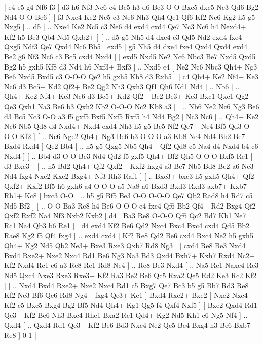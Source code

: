 \makegametitle 
|   e4   e5    g4   Nf6    f3 [  d3 h6  Nf3 Nc6  c4 Bc5  h3 d6  Be3 O-O  Bxc5 dxc5  Nc3 Qd6  Bg2 Nd4  O-O Be6   ]  [  f3 Nxe4  Ke2 Nc5  c3 Ne6  Nh3 Qh4  Qe1 Qf6  Kf2 Nc6  Kg2 h5  g5 Nxg5   ] .. d5 [ .. Nxe4  Ke2 Nc5  c3 Ne6  d4 exd4  cxd4 Qe7  Nc3 Nc6  h4 Nexd4+  Kf2 h5  Be3 Qb4  Nd5 Qxb2+   ]  [ .. d5  g5 Nh5  d4 dxe4  c3 Qd5  Nd2 exd4  fxe4 Qxg5  Ndf3 Qe7  Qxd4 Nc6  Bb5   ]  exd5 [  g5 Nh5  d4 dxe4  fxe4 Qxd4  Qxd4 exd4  Be2 g6  Nf3 Nc6  c3 Bc5  cxd4 Nxd4   ]  [  exd5 Nxd5  Ne2 Nc6  Nbc3 Be7  Nxd5 Qxd5  Bg2 h5  gxh5 Kf8  d3 Nd4  h6 Nxf3+  Bxf3   ] .. Nxd5    c4 [  Ne2 Nc6  Nbc3 Qh4+  Ng3 Be6  Nxd5 Bxd5  c3 O-O-O  Qe2 h5  gxh5 Kb8  d3 Rxh5   ]  [  c4 Qh4+  Ke2 Nf4+  Ke3 Nc6  d3 Bc5+  Kd2 Qf2+  Be2 Qg2  Nh3 Qxh3  Qf1 Qh6  Kd1 Nd4   ] .. Nb6 [ .. Qh4+  Ke2 Nf4+  Ke3 Nc6  d3 Bc5+  Kd2 Qf2+  Be2 Be3+  Kc3 Bxc1  Qxc1 Qg2  Qe3 Qxh1  Na3 Be6  b3 Qxh2  Kb2 O-O-O  Nc2 Kb8  a3   ]  [ .. Nb6  Ne2 Nc6  Ng3 Be6  d3 Bc5  Nc3 O-O  a3 f5  gxf5 Bxf5  Nxf5 Rxf5  h4 Nd4  Bg2   ]  Nc3   Nc6 [ .. Qh4+  Ke2 Nc6  Nb5 Qd8  d4 Nxd4+  Nxd4 exd4  Nh3 h5  g5 Bc5  Nf2 Qe7+  Ne4 Bf5  Qd3 O-O-O  Kf2   ]  [ .. Nc6  Nge2 Qh4+  Ng3 Be6  b3 O-O-O  a3 Kb8  Ne4 Nd4  Bb2 Be7  Bxd4 Rxd4   ]  Qe2   Bb4 [ .. h5  g5 Qxg5  Nb5 Qh4+  Qf2 Qd8  c5 Na4  d4 Nxd4  b4 c6  Nxd4   ]  [ .. Bb4  d3 O-O  Be3 Nd4  Qd2 f5  gxf5 Qh4+  Bf2 Qh5  O-O-O Bxf5  Re1   ]  d3   Bxc3+ [ .. h5  Bd2 Qh4+  Qf2 Qxf2+  Kxf2 hxg4  a3 Be7  Nb5 Bd8  Be2 a6  Nc3 Nd4  fxg4 Nxe2  Kxe2 Bxg4+  Nf3 Rh3  Raf1   ]  [ .. Bxc3+  bxc3 h5  gxh5 Qh4+  Qf2 Qxf2+  Kxf2 Bf5  h6 gxh6  a4 O-O-O  a5 Na8  a6 Bxd3  Bxd3 Rxd3  axb7+ Kxb7  Rb1+ Kc8   ]  bxc3   O-O [ .. h5  g5 Bf5  Be3 O-O  O-O-O Qe7  Qb2 Rad8  h4 Rd7  c5 Nd5  Bf2   ]  [ .. O-O  Ba3 Re8  h4 Be6  O-O-O e4  fxe4 Qf6  Bb2 Qf4+  Rd2 Bxg4  Qf2 Qxf2  Rxf2 Na4  Nf3 Nxb2  Kxb2   ]  d4 [  Ba3 Re8  O-O-O Qf6  Qc2 Bd7  Kb1 Ne7  Rc1 Na4  Qb3 b6  Re1   ]  [  d4 exd4  Kf2 Be6  Qd2 Nxc4  Bxc4 Bxc4  cxd4 Qd5  Bb2 Rae8  Kg2 f5  Qf4 fxg4   ] .. exd4    cxd4 [  Kf2 Re8  Qd2 Be6  cxd4 Bxc4  Ne2 h5  gxh5 Qh4+  Kg2 Nd5  Qb2 Ne3+  Bxe3 Rxe3  Qxb7 Rd8  Ng3   ]  [  cxd4 Re8  Be3 Nxd4  Bxd4 Rxe2+  Nxe2 Nxc4  Rd1 Be6  Ng3 Na3  Bd3 Qxd4  Bxh7+ Kxh7  Rxd4 Nc2+  Kf2 Nxd4  Rc1 c6  a3 Re8  Re1 Rd8  Ne4   ] .. Re8    Be3   Nxd4 [ .. Na5  Rc1 Naxc4  Rc3 Nd5  Qxc4 Nxe3  Rxe3 Rxe3+  Kf2 Ra3  Be2 Be6  Qc5 Rxa2  Qe5 Rd2  Ke3 Rc2  Kf2   ]  [ .. Nxd4  Bxd4 Rxe2+  Nxe2 Nxc4  Rd1 c5  Bxg7 Qe7  Bc3 b5  g5 Bb7  Rd3 Re8  Kf2 Ne3  Bf6 Qe6  Rd8 Ng4+  fxg4 Qe3+  Ke1   ]  Bxd4   Rxe2+    Bxe2 [  Nxe2 Nxc4  Kf2 c5  Bxc5 Bxg4  Bg2 Bf5  Nd4 Qh4+  Kg1 Qg5  f4 Qxf4  Nxf5   ]  [  Bxe2 Qxd4  Rd1 Qc3+  Kf2 Be6  Nh3 Bxc4  Rhe1 Bxa2  Rc1 Qd4+  Kg2 Nd5  Kh1 c6  Ng5 Nf4   ] .. Qxd4    [ .. Qxd4  Rd1 Qc3+  Kf2 Be6  Bd3 Nxc4  Ne2 Qe5  Be4 Bxg4  h3 Be6  Bxb7 Re8   ] 0-1  |

